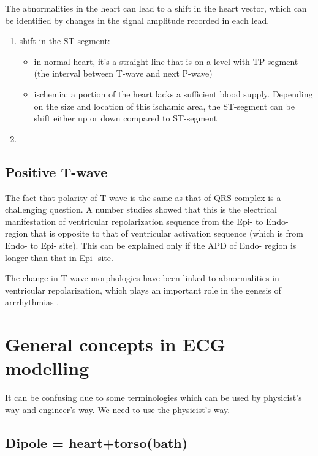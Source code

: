 The abnormalities in the heart can lead to a shift in the heart vector, which
can be identified by changes in the signal amplitude recorded in each lead.
\begin{enumerate}
  \item shift in the ST segment: 
  \begin{itemize}
    \item in normal heart, it's a straight line that is on a level with
    TP-segment (the interval between T-wave and next P-wave)
    \item ischemia: a portion of the heart lacks a sufficient blood supply.
    Depending on the size and location of this ischamic area, the ST-segment can
    be shift either up or down compared to ST-segment 
  \end{itemize}
  
  \item 
\end{enumerate}



\subsection{Positive T-wave}
\label{sec:positive_Twave}


The fact that polarity of T-wave is the same as that of QRS-complex is a
challenging question. A number studies showed that this is the electrical
manifestation of ventricular repolarization sequence from the Epi- to Endo-
region that is opposite to that of ventricular activation sequence (which is
from Endo- to Epi- site). This can be explained only if the APD of Endo- region
is longer than that in Epi- site.

The change in T-wave morphologies have been linked to abnormalities in
ventricular repolarization, which plays an important role in the genesis of
arrrhythmias \citep{zhu2009}.

\section{General concepts in ECG modelling}

It can be confusing due to some terminologies which can be used by physicist's
way and engineer's way. We need to use the physicist's way.

\subsection{Dipole = heart+torso(bath)}
\label{sec:heart_dipole}

